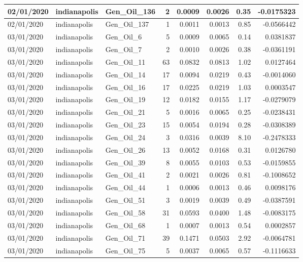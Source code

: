 \documentclass[
  letterpaper,
  DIV=11,
  numbers=noendperiod]{scrartcl}
\begin{document}
\begin{tabular}{l|l|l|r|r|r|r|r}
\hline
02/01/2020 & indianapolis & Gen\_Oil\_136 & 2 & 0.0009 & 0.0026 & 0.35 & -0.0175323\\
\hline
02/01/2020 & indianapolis & Gen\_Oil\_137 & 1 & 0.0011 & 0.0013 & 0.85 & -0.0566442\\
\hline
03/01/2020 & indianapolis & Gen\_Oil\_6 & 5 & 0.0009 & 0.0065 & 0.14 & 0.0381837\\
\hline
03/01/2020 & indianapolis & Gen\_Oil\_7 & 2 & 0.0010 & 0.0026 & 0.38 & -0.0361191\\
\hline
03/01/2020 & indianapolis & Gen\_Oil\_11 & 63 & 0.0832 & 0.0813 & 1.02 & 0.0127464\\
\hline
03/01/2020 & indianapolis & Gen\_Oil\_14 & 17 & 0.0094 & 0.0219 & 0.43 & -0.0014060\\
\hline
03/01/2020 & indianapolis & Gen\_Oil\_16 & 17 & 0.0225 & 0.0219 & 1.03 & 0.0003547\\
\hline
03/01/2020 & indianapolis & Gen\_Oil\_19 & 12 & 0.0182 & 0.0155 & 1.17 & -0.0279079\\
\hline
03/01/2020 & indianapolis & Gen\_Oil\_21 & 5 & 0.0016 & 0.0065 & 0.25 & -0.0238431\\
\hline
03/01/2020 & indianapolis & Gen\_Oil\_23 & 15 & 0.0054 & 0.0194 & 0.28 & -0.0308389\\
\hline
03/01/2020 & indianapolis & Gen\_Oil\_24 & 3 & 0.0316 & 0.0039 & 8.10 & -0.2478333\\
\hline
03/01/2020 & indianapolis & Gen\_Oil\_26 & 13 & 0.0052 & 0.0168 & 0.31 & 0.0126780\\
\hline
03/01/2020 & indianapolis & Gen\_Oil\_39 & 8 & 0.0055 & 0.0103 & 0.53 & -0.0159855\\
\hline
03/01/2020 & indianapolis & Gen\_Oil\_41 & 2 & 0.0021 & 0.0026 & 0.81 & -0.1008652\\
\hline
03/01/2020 & indianapolis & Gen\_Oil\_44 & 1 & 0.0006 & 0.0013 & 0.46 & 0.0098176\\
\hline
03/01/2020 & indianapolis & Gen\_Oil\_51 & 3 & 0.0019 & 0.0039 & 0.49 & -0.0387591\\
\hline
03/01/2020 & indianapolis & Gen\_Oil\_58 & 31 & 0.0593 & 0.0400 & 1.48 & -0.0083175\\
\hline
03/01/2020 & indianapolis & Gen\_Oil\_68 & 1 & 0.0007 & 0.0013 & 0.54 & 0.0002857\\
\hline
03/01/2020 & indianapolis & Gen\_Oil\_71 & 39 & 0.1471 & 0.0503 & 2.92 & -0.0064781\\
\hline
03/01/2020 & indianapolis & Gen\_Oil\_75 & 5 & 0.0037 & 0.0065 & 0.57 & -0.1116633\\

\end{tabular}
\end{document}
